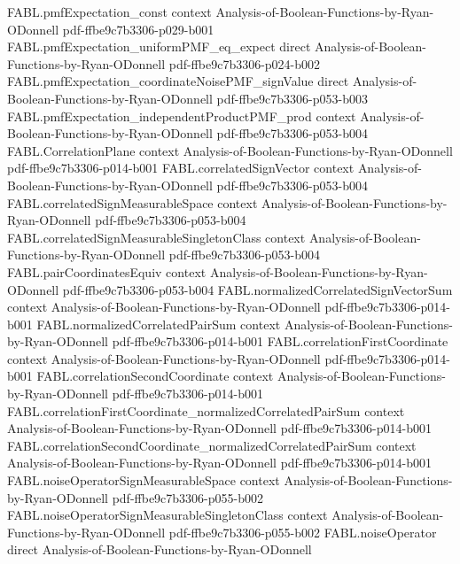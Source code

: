 \begin{theorem}
\proofstep
  {FABL.pmfExpectation_const}
  {context}
  {Analysis-of-Boolean-Functions-by-Ryan-ODonnell}
  {pdf-ffbe9c7b3306-p029-b001}
\proofstep
  {FABL.pmfExpectation_uniformPMF_eq_expect}
  {direct}
  {Analysis-of-Boolean-Functions-by-Ryan-ODonnell}
  {pdf-ffbe9c7b3306-p024-b002}
\proofstep
  {FABL.pmfExpectation_coordinateNoisePMF_signValue}
  {direct}
  {Analysis-of-Boolean-Functions-by-Ryan-ODonnell}
  {pdf-ffbe9c7b3306-p053-b003}
\proofstep
  {FABL.pmfExpectation_independentProductPMF_prod}
  {context}
  {Analysis-of-Boolean-Functions-by-Ryan-ODonnell}
  {pdf-ffbe9c7b3306-p053-b004}
\proofstep
  {FABL.CorrelationPlane}
  {context}
  {Analysis-of-Boolean-Functions-by-Ryan-ODonnell}
  {pdf-ffbe9c7b3306-p014-b001}
\proofstep
  {FABL.correlatedSignVector}
  {context}
  {Analysis-of-Boolean-Functions-by-Ryan-ODonnell}
  {pdf-ffbe9c7b3306-p053-b004}
\proofstep
  {FABL.correlatedSignMeasurableSpace}
  {context}
  {Analysis-of-Boolean-Functions-by-Ryan-ODonnell}
  {pdf-ffbe9c7b3306-p053-b004}
\proofstep
  {FABL.correlatedSignMeasurableSingletonClass}
  {context}
  {Analysis-of-Boolean-Functions-by-Ryan-ODonnell}
  {pdf-ffbe9c7b3306-p053-b004}
\proofstep
  {FABL.pairCoordinatesEquiv}
  {context}
  {Analysis-of-Boolean-Functions-by-Ryan-ODonnell}
  {pdf-ffbe9c7b3306-p053-b004}
\proofstep
  {FABL.normalizedCorrelatedSignVectorSum}
  {context}
  {Analysis-of-Boolean-Functions-by-Ryan-ODonnell}
  {pdf-ffbe9c7b3306-p014-b001}
\proofstep
  {FABL.normalizedCorrelatedPairSum}
  {context}
  {Analysis-of-Boolean-Functions-by-Ryan-ODonnell}
  {pdf-ffbe9c7b3306-p014-b001}
\proofstep
  {FABL.correlationFirstCoordinate}
  {context}
  {Analysis-of-Boolean-Functions-by-Ryan-ODonnell}
  {pdf-ffbe9c7b3306-p014-b001}
\proofstep
  {FABL.correlationSecondCoordinate}
  {context}
  {Analysis-of-Boolean-Functions-by-Ryan-ODonnell}
  {pdf-ffbe9c7b3306-p014-b001}
\proofstep
  {FABL.correlationFirstCoordinate_normalizedCorrelatedPairSum}
  {context}
  {Analysis-of-Boolean-Functions-by-Ryan-ODonnell}
  {pdf-ffbe9c7b3306-p014-b001}
\proofstep
  {FABL.correlationSecondCoordinate_normalizedCorrelatedPairSum}
  {context}
  {Analysis-of-Boolean-Functions-by-Ryan-ODonnell}
  {pdf-ffbe9c7b3306-p014-b001}
\proofstep
  {FABL.noiseOperatorSignMeasurableSpace}
  {context}
  {Analysis-of-Boolean-Functions-by-Ryan-ODonnell}
  {pdf-ffbe9c7b3306-p055-b002}
\proofstep
  {FABL.noiseOperatorSignMeasurableSingletonClass}
  {context}
  {Analysis-of-Boolean-Functions-by-Ryan-ODonnell}
  {pdf-ffbe9c7b3306-p055-b002}
\proofstep
  {FABL.noiseOperator}
  {direct}
  {Analysis-of-Boolean-Functions-by-Ryan-ODonnell}

\end{theorem}
